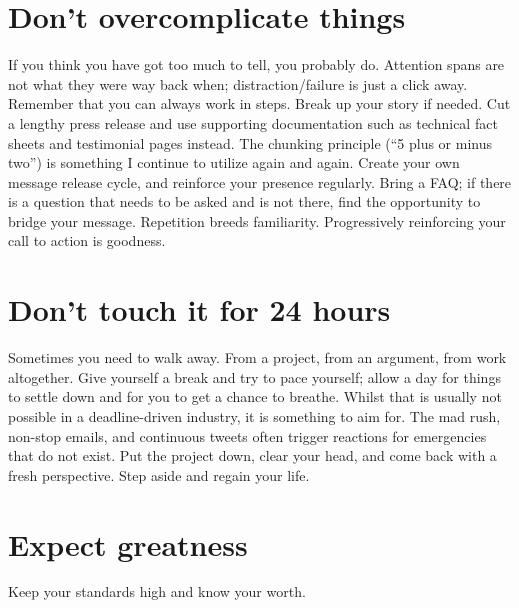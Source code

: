 \section*{Don't overcomplicate things}
If you think you have got too much to tell, you probably do. Attention spans are
not what they were way back when; distraction/failure is just a click away.
Remember that you can always work in steps. Break up your story if needed. Cut a
lengthy press release and use supporting documentation such as technical fact
sheets and testimonial pages instead. The chunking principle (``5 plus or minus
two'') is something I continue to utilize again and again. Create your own
message release cycle, and reinforce your presence regularly. Bring a FAQ; if
there is a question that needs to be asked and is not there, find the opportunity
to bridge your message. Repetition breeds familiarity. Progressively reinforcing
your call to action is goodness.

\section*{Don't touch it for 24 hours}
Sometimes you need to walk away. From a project, from an argument, from work
altogether. Give yourself a break and try to pace yourself; allow a day for
things to settle down and for you to get a chance to breathe. Whilst that is
usually not possible in a deadline-driven industry, it is something to aim for.
The mad rush, non-stop emails, and continuous tweets often trigger reactions for
emergencies that do not exist. Put the project down, clear your head, and come
back with a fresh perspective. Step aside and regain your life.

\section*{Expect greatness}
Keep your standards high and know your worth.
